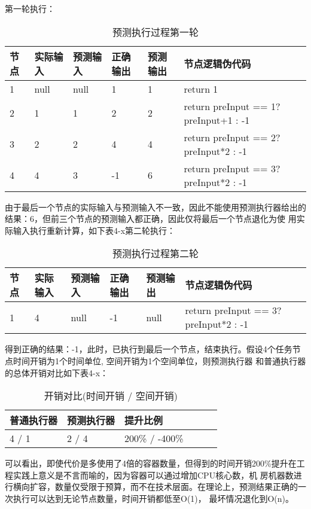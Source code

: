 第一轮执行：
\begin{table}[H]
    \centering
    \caption{预测执行过程第一轮}
    \label{tab:predict_process_1}
    \begin{tabular}{llllll}
        \toprule
        节点 &实际输入 &预测输入 &正确输出 &预测输出 &节点逻辑伪代码\\
        \midrule
        1 &null    &null   &1       &1       &return 1 \\
        2 &1       &1      &2       &2       &return preInput == 1? preInput+1 : -1 \\
        3 &2       &2      &4       &4       &return preInput == 2? preInput*2 : -1 \\
        4 &4       &3      &-1      &6       &return preInput == 3? preInput*2 : -1 \\
        \bottomrule
    \end{tabular}
\end{table}
由于最后一个节点的实际输入与预测输入不一致，因此不能使用预测执行器给出的结果：6，但前三个节点的预测输入都正确，因此仅将最后一个节点退化为使
用实际输入执行重新计算，如下表4-x第二轮执行：

\begin{table}[H]
    \centering
    \caption{预测执行过程第二轮}
    \label{tab:predict_process_2}
    \begin{tabular}{llllll}
        \toprule
        节点 &实际输入 &预测输入 &正确输出 &预测输出 &节点逻辑伪代码\\
        \midrule
        1 &4       &null      &-1      &null       &return preInput == 3? preInput*2 : -1
    \end{tabular}
\end{table}

得到正确的结果：-1，此时，已执行到最后一个节点，结束执行。假设4个任务节点时间开销为1个时间单位, 空间开销为1个空间单位，则预测执行器
和普通执行器的总体开销对比如下表4-x：

\begin{table}[H]
    \centering
    \caption{开销对比(时间开销 / 空间开销)}
    \label{tab:cost}
    \begin{tabular}{llllll}
        \toprule
        普通执行器 & 预测执行器 & 提升比例 \\
        \midrule
        4 / 1   &2 / 4   &200\% / -400\% \\
        \bottomrule
    \end{tabular}
\end{table}

可以看出，即使代价是多使用了4倍的容器数量，但得到的时间开销200\%提升在工程实践上意义是不言而喻的，因为容器可以通过增加CPU核心数，机
房机器数进行横向扩容，数量仅受限于预算，而不在技术层面。在理论上，预测结果正确的一次执行可以达到无论节点数量，时间开销都低至O(1)，
最坏情况退化到O(n)。

